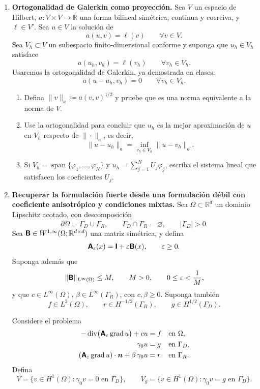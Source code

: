 \documentclass[11pt]{article}
\theoremstyle{thmstyle}
\def\mat   #1{\mbox{\boldmath $\mathsf #1$}}
\def\vec   #1{\mbox{\boldmath $#1$}{}}
\DeclareMathOperator{\dive}{div}
\DeclareMathOperator{\grad}{grad}
\def\R{\mathbb R}
\begin{document}
\begin{enumerate}[label=\textbf{\arabic*.}, leftmargin=*]
    \item \textbf{Ortogonalidad de Galerkin como proyecci\'on.} Sea $V$ un espacio de Hilbert, $a:V\times V\to\R$ una forma bilineal sim\'etrica, continua y coerciva, y $\ell\in V'$. Sea $u\in V$ la soluci\'on de
    \[
        a(u,v)=\ell(v)
        \qquad\forall v\in V.
    \]
    Sea $V_h\subset V$ un subespacio finito-dimensional conforme y suponga que $u_h\in V_h$ satisface
    \[
        a(u_h,v_h)=\ell(v_h)
        \qquad\forall v_h\in V_h.
    \]
    Usaremos la ortogonalidad de Galerkin, ya demostrada en clases:
    \[
        a(u-u_h,v_h)=0
        \qquad\forall v_h\in V_h.
    \]
    \begin{enumerate}[label=(\alph*)]
        \item Defina $\|v\|_a\coloneqq a(v,v)^{1/2}$ y pruebe que es una norma equivalente a la norma de $V$.
        \item Use la ortogonalidad para concluir que $u_h$ es la mejor aproximaci\'on de $u$ en $V_h$ respecto de $\|\cdot\|_a$, es decir,
        \[
            \|u-u_h\|_a=\inf_{v_h\in V_h}\|u-v_h\|_a.
        \]
        \item Si $V_h=\operatorname{span}\{\varphi_1,\dots,\varphi_N\}$ y $u_h=\sum_{j=1}^N U_j\varphi_j$, escriba el sistema lineal que satisfacen los coeficientes $U_j$.
    \end{enumerate}

\item \textbf{Recuperar la formulaci\'on fuerte desde una formulaci\'on d\'ebil con coeficiente anisotr\'opico y condiciones mixtas.}
Sea $\Omega\subset\R^d$ un dominio Lipschitz acotado, con descomposici\'on
\[
\partial\Omega=\overline{\Gamma_D}\cup\overline{\Gamma_R},
\qquad
\Gamma_D\cap\Gamma_R=\varnothing,
\qquad
|\Gamma_D|>0.
\]
Sea $\mat B\in W^{1,\infty}(\Omega;\R^{d\times d})$ una matriz sim\'etrica, y defina
\[
\mat A_\varepsilon(x)=\mat I+\varepsilon \mat B(x),
\qquad \varepsilon\ge 0.
\]
Suponga adem\'as que
\[
\|\mat B\|_{L^\infty(\Omega)}\le M,
\qquad
M>0,
\qquad
0\le \varepsilon<\frac1M,
\]
y que $c\in L^\infty(\Omega)$, $\beta\in L^\infty(\Gamma_R)$, con $c,\beta\ge 0$. Suponga tambi\'en
\[
    f\in L^2(\Omega),
    \qquad
    r\in H^{-1/2}(\Gamma_R),
    \qquad
    g\in H^{1/2}(\Gamma_D).
\]

Considere el problema
\[
\begin{aligned}
-\dive\!\big(\mat A_\varepsilon \grad u\big)+cu &= f &&\text{en }\Omega,\\
\gamma_0u &= g &&\text{en }\Gamma_D,\\
(\mat A_\varepsilon\grad u)\cdot \vec n+\beta\,\gamma_0u &= r &&\text{en }\Gamma_R.
\end{aligned}
\]
Defina
\[
V=\{v\in H^1(\Omega):\gamma_0v=0\text{ en }\Gamma_D\},
\qquad
V_g=\{v\in H^1(\Omega):\gamma_0v=g\text{ en }\Gamma_D\}.
\]


\end{enumerate}
\end{document}
